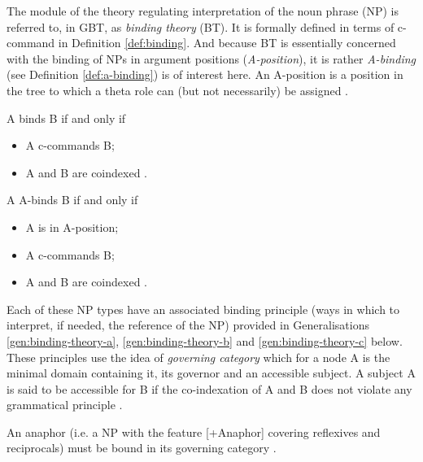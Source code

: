     The module of the theory regulating interpretation of the noun phrase (NP) is referred to, in GBT, as \textit{binding theory} (BT). It is formally defined in terms of c-command in Definition \ref{def:binding}. And because BT is essentially concerned with the binding of NPs in argument positions (\textit{A-position}), it is rather \textit{A-binding} (see Definition \ref{def:a-binding}) is of interest here. An A-position is a position in the tree to which a theta role can (but not necessarily) be assigned \citep[115]{Haegeman1991}.

    \begin{definition}[Binding]\label{def:binding}
        A binds B if and only if
        \begin{itemize}
            \item A c-commands B;
            \item A and B are coindexed \citep[212]{Haegeman1991}.
        \end{itemize}
    \end{definition}
    
    \begin{definition}[A-Binding]\label{def:a-binding}
        A A-binds B if and only if
        \begin{itemize}
            \item A is in A-position;
            \item A c-commands B;
            \item A and B are coindexed \citep[240]{Haegeman1991}.
        \end{itemize}
    \end{definition}

    Each of these NP types have an associated binding principle (ways in which to interpret, if needed, the reference of the NP) provided in Generalisations \ref{gen:binding-theory-a}, \ref{gen:binding-theory-b} and \ref{gen:binding-theory-c} below. These principles use the idea of \textit{governing category} which for a node A is the minimal domain containing it, its governor and an accessible subject. A subject A is said to be accessible for B if the co-indexation of A and B does not violate any grammatical principle \citep[241]{Haegeman1991}.

    \begin{generalization}\label{gen:binding-theory-a}
        An anaphor (i.e. a NP with the feature [+Anaphor] covering reflexives and reciprocals) must be bound in its governing category \citep[224]{Haegeman1991}.
    \end{generalization}
    
